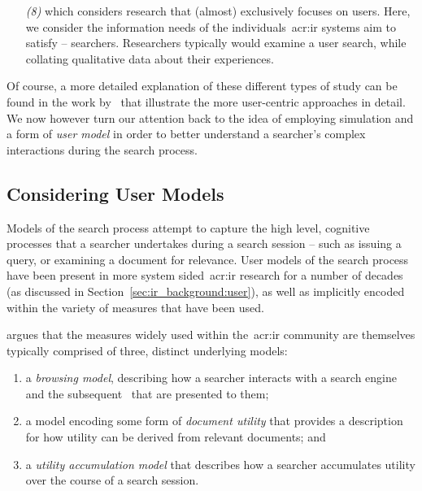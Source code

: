 \begin{itemize}
    
    \item[\emph{(8)}]{ which considers research that (almost) exclusively focuses on users. Here, we consider the information needs of the individuals~\gls{acr:ir} systems aim to satisfy -- searchers. Researchers typically would examine a user search, while collating qualitative data about their experiences.}
    
\end{itemize}

Of course, a more detailed explanation of these different types of study can be found in the work by~\cite{kelly2009iir} that illustrate the more user-centric approaches in detail. We now however turn our attention back to the idea of employing simulation and a form of \emph{user model} in order to better understand a searcher's complex interactions during the search process.

\subsection{Considering User Models}\label{sec:ir_background:user:models}
Models of the search process attempt to capture the high level, cognitive processes that a searcher undertakes during a search session -- such as issuing a query, or examining a document for relevance. User models of the search process have been present in more system sided~\gls{acr:ir} research for a number of decades (as discussed in Section~\ref{sec:ir_background:user}), as well as implicitly encoded within the variety of measures that have been used.

\cite{carterette2011models} argues that the measures widely used within the~\gls{acr:ir} community are themselves typically comprised of three, distinct underlying models:

\begin{enumerate}
    \item{a \emph{browsing model}, describing how a searcher interacts with a search engine and the subsequent~ that are presented to them;}
    \item{a model encoding some form of \emph{document utility} that provides a description for how utility can be derived from relevant documents; and}
    \item{a \emph{utility accumulation model} that describes how a searcher accumulates utility over the course of a search session.}
\end{enumerate}

